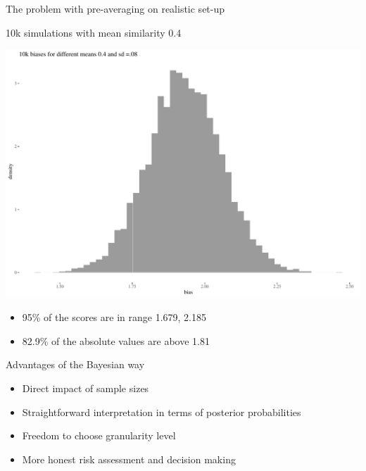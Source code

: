 \documentclass[
  10pt,
  ignorenonframetext,
  x11names, dvipsnames, bibspacing,natbib, table]{beamer}
\providecommand{\tightlist}{%
  \setlength{\itemsep}{0pt}\setlength{\parskip}{0pt}}
\begin{document}
\begin{frame}{The problem with pre-averaging on realistic set-up}
\protect\hypertarget{the-problem-with-pre-averaging-on-realistic-set-up-3}{}
\begin{block}{10k simulations with mean similarity 0.4}
\protect\hypertarget{k-simulations-with-mean-similarity-0.4}{}
\vspace{1mm}
\footnotesize

\begin{center}\includegraphics[width=0.8\linewidth]{presentationBoston_files/figure-beamer/unnamed-chunk-13-1} \end{center}
\vspace{1mm}
\footnotesize

\normalsize

\footnotesize

\vspace{-2mm}

\begin{itemize}
\tightlist
\item
  95\% of the scores are in range 1.679, 2.185
\item
  82.9\% of the absolute values are above 1.81
\end{itemize}
\end{block}
\end{frame}

\begin{frame}{Advantages of the Bayesian way}
\protect\hypertarget{advantages-of-the-bayesian-way}{}
\begin{itemize}
\tightlist
\item
  Direct impact of sample sizes
\item
  Straightforward interpretation in terms of posterior probabilities
\item
  Freedom to choose granularity level
\item
  More honest risk assessment and decision making
\end{itemize}
\end{frame}
\end{document}
